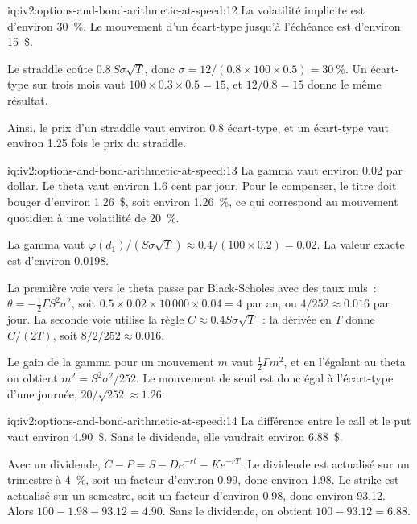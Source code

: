 \begin{solution}{iq:iv2:options-and-bond-arithmetic-at-speed:12}
La volatilité implicite est d'environ 30~\%. Le mouvement d'un écart-type jusqu'à l'échéance est d'environ 15~\$.

Le straddle coûte $0.8\,S\sigma\sqrt T$, donc $\sigma = 12/(0.8 \times 100 \times 0.5) = 30~\%$. Un écart-type sur trois mois vaut $100 \times 0.3 \times 0.5 = 15$, et $12/0.8 = 15$ donne le même résultat.

Ainsi, le prix d'un straddle vaut environ 0.8 écart-type, et un écart-type vaut environ 1.25 fois le prix du straddle.

\end{solution}

\begin{solution}{iq:iv2:options-and-bond-arithmetic-at-speed:13}
La gamma vaut environ 0.02 par dollar. Le theta vaut environ 1.6 cent par jour. Pour le compenser, le titre doit bouger d'environ 1.26~\$, soit environ 1.26~\%, ce qui correspond au mouvement quotidien à une volatilité de 20~\%.

La gamma vaut $\varphi(d_1)/(S\sigma\sqrt T) \approx 0.4/(100 \times 0.2) = 0.02$. La valeur exacte est d'environ 0.0198.

La première voie vers le theta passe par Black-Scholes avec des taux nuls~: $\theta = -\tfrac12\Gamma S^2\sigma^2$, soit $0.5 \times 0.02 \times 10\,000 \times 0.04 = 4$ par an, ou $4/252 \approx 0.016$ par jour. La seconde voie utilise la règle $C \approx 0.4S\sigma\sqrt T$~: la dérivée en $T$ donne $C/(2T)$, soit $8/2/252 \approx 0.016$.

Le gain de la gamma pour un mouvement $m$ vaut $\tfrac12\Gamma m^2$, et en l'égalant au theta on obtient $m^2 = S^2\sigma^2/252$. Le mouvement de seuil est donc égal à l'écart-type d'une journée, $20/\sqrt{252} \approx 1.26$.

\end{solution}

\begin{solution}{iq:iv2:options-and-bond-arithmetic-at-speed:14}
La différence entre le call et le put vaut environ 4.90~\$. Sans le dividende, elle vaudrait environ 6.88~\$.

Avec un dividende, $C - P = S - De^{-rt} - Ke^{-rT}$. Le dividende est actualisé sur un trimestre à 4~\%, soit un facteur d'environ 0.99, donc environ 1.98. Le strike est actualisé sur un semestre, soit un facteur d'environ 0.98, donc environ 93.12. Alors $100 - 1.98 - 93.12 = 4.90$. Sans le dividende, on obtient $100 - 93.12 = 6.88$.

\end{solution}

